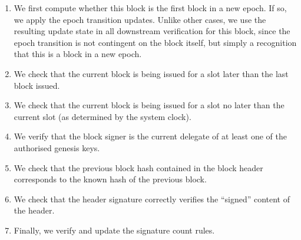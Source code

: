 \documentclass[11pt,a4paper]{article}
\begin{document}
\begin{enumerate}
  \item We first compute whether this block is the first block in a new epoch.
    If so, we apply the epoch transition updates. Unlike other cases, we use the
    resulting update state in all downstream verification for this block, since
    the epoch transition is not contingent on the block itself, but simply a
    recognition that this is a block in a new epoch.
  \item We check that the current block is being issued for a slot later than
    the last block issued.
  \item We check that the current block is being issued for a slot no later than
    the current slot (as determined by the system clock).
  \item We verify that the block signer is the current delegate of at least one
    of the authorised genesis keys.
  \item We check that the previous block hash contained in the block header
    corresponds to the known hash of the previous block.
  \item We check that the header signature correctly verifies the ``signed''
    content of the header.
  \item Finally, we verify and update the signature count rules.
\end{enumerate}
\end{document}
